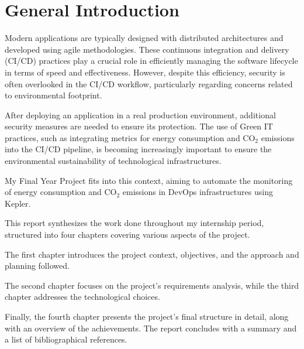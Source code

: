 \chapter*{General Introduction}

Modern applications are typically designed with distributed architectures and developed using agile methodologies. These continuous integration and delivery (CI/CD) practices play a crucial role in efficiently managing the software lifecycle in terms of speed and effectiveness. However, despite this efficiency, security is often overlooked in the CI/CD workflow, particularly regarding concerns related to environmental footprint.

After deploying an application in a real production environment, additional security measures are needed to ensure its protection. The use of Green IT practices, such as integrating metrics for energy consumption and CO$_2$ emissions into the CI/CD pipeline, is becoming increasingly important to ensure the environmental sustainability of technological infrastructures.

My Final Year Project fits into this context, aiming to automate the monitoring of energy consumption and CO$_2$ emissions in DevOps infrastructures using Kepler. 

\vspace{10pt} %

This report synthesizes the work done throughout my internship period, structured into four chapters covering various aspects of the project. 

\vspace{10pt} 

The first chapter introduces the project context, objectives, and the approach and planning followed. 

\vspace{10pt} 

The second chapter focuses on the project's requirements analysis, while the third chapter addresses the technological choices. 

\vspace{10pt} 

Finally, the fourth chapter presents the project's final structure in detail, along with an overview of the achievements. The report concludes with a summary and a list of bibliographical references.
